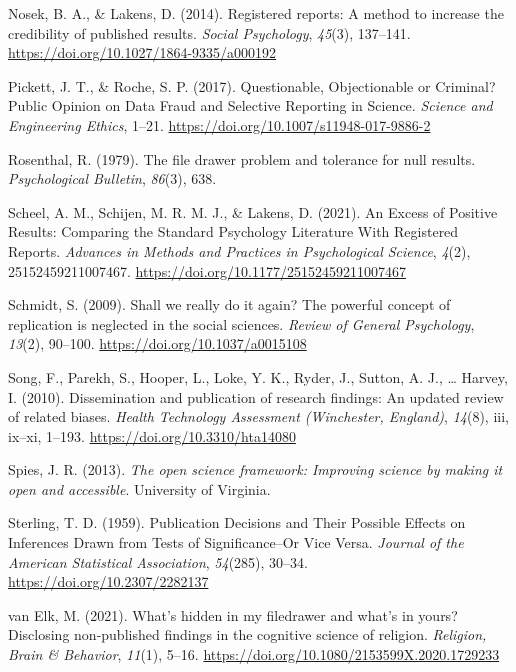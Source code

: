 \documentclass[
  ,jou, a4paper,floatsintext]{apa6}
\newlength{\cslhangindent}
\newlength{\cslentryspacingunit} %
\newenvironment{CSLReferences}[2] %
 {%
  \setlength{\parindent}{0pt}
  \ifodd #1
  \let\oldpar\par
  \def\par{\hangindent=\cslhangindent\oldpar}
  \fi
  \setlength{\parskip}{#2\cslentryspacingunit}
 }%
 {}
\begin{document}
\begin{CSLReferences}{1}{0}
\leavevmode{}%
Nosek, B. A., \& Lakens, D. (2014). Registered reports: {A} method to increase the credibility of published results. \emph{Social Psychology}, \emph{45}(3), 137--141. \url{https://doi.org/10.1027/1864-9335/a000192}

\leavevmode{}%
Pickett, J. T., \& Roche, S. P. (2017). Questionable, {Objectionable} or {Criminal}? {Public Opinion} on {Data Fraud} and {Selective Reporting} in {Science}. \emph{Science and Engineering Ethics}, 1--21. \url{https://doi.org/10.1007/s11948-017-9886-2}

\leavevmode{}%
Rosenthal, R. (1979). The file drawer problem and tolerance for null results. \emph{Psychological Bulletin}, \emph{86}(3), 638.

\leavevmode{}%
Scheel, A. M., Schijen, M. R. M. J., \& Lakens, D. (2021). An {Excess} of {Positive Results}: {Comparing} the {Standard Psychology Literature With Registered Reports}. \emph{Advances in Methods and Practices in Psychological Science}, \emph{4}(2), 25152459211007467. \url{https://doi.org/10.1177/25152459211007467}

\leavevmode{}%
Schmidt, S. (2009). Shall we really do it again? {The} powerful concept of replication is neglected in the social sciences. \emph{Review of General Psychology}, \emph{13}(2), 90--100. \url{https://doi.org/10.1037/a0015108}

\leavevmode{}%
Song, F., Parekh, S., Hooper, L., Loke, Y. K., Ryder, J., Sutton, A. J., \ldots{} Harvey, I. (2010). Dissemination and publication of research findings: An updated review of related biases. \emph{Health Technology Assessment (Winchester, England)}, \emph{14}(8), iii, ix--xi, 1--193. \url{https://doi.org/10.3310/hta14080}

\leavevmode{}%
Spies, J. R. (2013). \emph{The open science framework: {Improving} science by making it open and accessible}. {University of Virginia}.

\leavevmode{}%
Sterling, T. D. (1959). Publication {Decisions} and {Their Possible Effects} on {Inferences Drawn} from {Tests} of {Significance--Or Vice Versa}. \emph{Journal of the American Statistical Association}, \emph{54}(285), 30--34. \url{https://doi.org/10.2307/2282137}

\leavevmode{}%
van Elk, M. (2021). What's hidden in my filedrawer and what's in yours? {Disclosing} non-published findings in the cognitive science of religion. \emph{Religion, Brain \& Behavior}, \emph{11}(1), 5--16. \url{https://doi.org/10.1080/2153599X.2020.1729233}

\end{CSLReferences}

\endgroup
\end{document}
